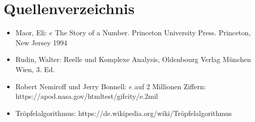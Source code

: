 \section{Quellenverzeichnis}
\begin{itemize}
  \item Maor, Eli: $e$ The Story of a Number. Princeton University Press. Princeton, New Jersey 1994
  \item Rudin, Walter: Reelle und Komplexe Analysis, Oldenbourg Verlag München Wien, 3. Ed.
  \item  Robert Nemiroff und Jerry Bonnell: $e$ auf 2 Millionen Ziffern: https://apod.nasa.gov/htmltest/gifcity/e.2mil
  \item Tröpfelalgorithmus: https://de.wikipedia.org/wiki/Tröpfelalgorithmus
\end{itemize}
